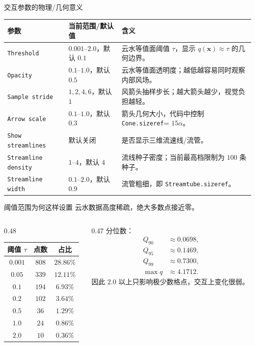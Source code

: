 \documentclass[aspectratio=169,11pt]{ctexbeamer}
\newcommand{\vx}{\mathbf x}
\begin{document}
\begin{frame}{交互参数的物理/几何意义}
  \scriptsize
  \begin{tabularx}{\linewidth}{l l X}
    \toprule
    参数 & 当前范围/默认值 & 含义 \\
    \midrule
    \texttt{Threshold} & $0.001$--$2.0$，默认 $0.1$ &
    云水等值面阈值 $\tau$，显示 $q(\vx)\approx\tau$ 的几何边界。\\
    \texttt{Opacity} & $0.1$--$1.0$，默认 $0.5$ &
    云水等值面透明度；越低越容易同时观察内部风场。\\
    \texttt{Sample stride} & $1,2,4,6$，默认 $1$ &
    风箭头抽样步长；越大箭头越少，视觉负担越轻。\\
    \texttt{Arrow scale} & $0.1$--$1.0$，默认 $0.3$ &
    箭头几何大小，代码中控制 \texttt{Cone.sizeref}= $15\alpha$。\\
    \texttt{Show streamlines} & 默认关闭 &
    是否显示三维流速线/流管。\\
    \texttt{Streamline density} & $1$--$4$，默认 $4$ &
    流线种子密度；当前最高档限制为 $100$ 条种子。\\
    \texttt{Streamline width} & $0.1$--$2.0$，默认 $0.9$ &
    流管粗细，即 \texttt{Streamtube.sizeref}。\\
    \bottomrule
  \end{tabularx}
\end{frame}

\begin{frame}{阈值范围为何这样设置}
  \small
  云水数据高度稀疏，绝大多数点接近零。

  \begin{columns}
    \begin{column}{0.48\linewidth}
      \begin{tabular}{ccc}
        \toprule
        阈值 $\tau$ & 点数 & 占比 \\
        \midrule
        $0.001$ & $808$ & $28.86\%$\\
        $0.05$ & $339$ & $12.11\%$\\
        $0.1$ & $194$ & $6.93\%$\\
        $0.2$ & $102$ & $3.64\%$\\
        $0.5$ & $36$ & $1.29\%$\\
        $1.0$ & $24$ & $0.86\%$\\
        $2.0$ & $10$ & $0.36\%$\\
        \bottomrule
      \end{tabular}
    \end{column}
    \begin{column}{0.47\linewidth}
      分位数：
      \[
      \begin{aligned}
        Q_{90} &\approx 0.0698,\\
        Q_{95} &\approx 0.1469,\\
        Q_{99} &\approx 0.7300,\\
        \max q &\approx 4.1712.
      \end{aligned}
      \]
      因此 $2.0$ 以上只影响极少数格点，交互上变化很弱。
    \end{column}
  \end{columns}
\end{frame}
\end{document}
